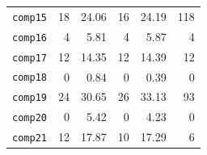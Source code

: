 \documentclass[authoryear,12pt]{article}
\begin{document}
\begin{table}[htdp]
\begin{scriptsize}
\begin{center}
\begin{tabular}{l|rr|rr|r}
\texttt{comp15} & 18 & 24.06 & 16 & 24.19 & 118 \\
\texttt{comp16} & 4 & 5.81 & 4 & 5.87 & 4 \\
\texttt{comp17} & 12 & 14.35 & 12 & 14.39 & 12 \\
\texttt{comp18} & 0 & 0.84 & 0 & 0.39 & 0 \\
\texttt{comp19} & 24 & 30.65 & 26 & 33.13 & 93 \\
\texttt{comp20} & 0 & 5.42 & 0 & 4.23 & 0 \\
\texttt{comp21} & 12 & 17.87 & 10 & 17.29 & 6 \\
\bottomrule
   \end{tabular}
    \end{center}
    \end{scriptsize}
    \end{table}%
\end{document}

